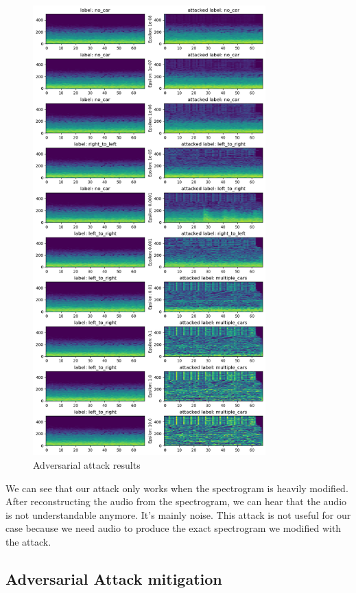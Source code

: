 \begin{figure}[H]
    \centering
    \includegraphics[width=0.8\textwidth]{images/adversarial_attack_results.png}
    \caption{Adversarial attack results}
    \label{fig:adversarial_attack_results}
\end{figure}

We can see that our attack only works when the spectrogram is heavily modified. After reconstructing the audio from the spectrogram, we can hear that the audio is not understandable anymore. It's mainly noise. This attack is not useful for our case because we need audio to produce the exact spectrogram we modified with the attack.

\subsection{Adversarial Attack mitigation}

